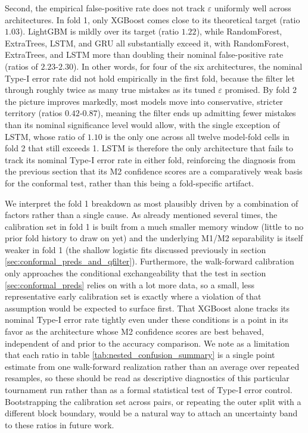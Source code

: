 \documentclass[12pt, a4paper]{article}
\begin{document}
\medskip

Second, the empirical false-positive rate does not track $\varepsilon$ uniformly well across architectures. In fold 1, only XGBoost 
comes close to its theoretical target (ratio $1.03$). LightGBM is mildly over its target (ratio $1.22$), while RandomForest, ExtraTrees, LSTM, and GRU all substantially exceed 
it, with RandomForest, ExtraTrees, and LSTM more than doubling their nominal false-positive rate (ratios of $2.23$-$2.30$). In other words, for four of the six architectures, the 
nominal Type-I error rate did not hold empirically in the first fold, because the filter let through roughly twice as many true mistakes as its tuned $\varepsilon$ promised. By fold 2 the 
picture improves markedly, most models move into conservative, stricter territory (ratios $0.42$-$0.87$), meaning the filter ends up admitting fewer mistakes than its 
nominal significance level would allow, with the single exception of LSTM, whose ratio of $1.10$ is the only one across all twelve model-fold cells in fold 2 that still exceeds 1. LSTM is therefore the only 
architecture that fails to track its nominal Type-I error rate in either fold, reinforcing the diagnosis from the previous section that its M2 confidence scores are a 
comparatively weak basis for the conformal test, rather than this being a fold-specific artifact.

\medskip

We interpret the fold 1 breakdown as most plausibly driven by a combination of factors rather than a single cause. As already mentioned several times, the calibration set in fold 1 
is built from a much smaller memory window (little to no prior fold history to draw on yet) and the underlying M1/M2 separability is itself weaker in fold 1 
(the shallow logistic fits discussed previously in section \ref{sec:conformal_preds_and_qfilter}). Furthermore, the walk-forward calibration only approaches the conditional 
exchangeability that the test in section \ref{sec:conformal_preds} relies on with a lot more data, so a small, less representative early calibration set is exactly where a violation of 
that assumption would be expected to surface first. That XGBoost alone tracks its nominal Type-I error rate tightly even under these conditions is a point in its favor as the 
architecture whose M2 confidence scores are best behaved, independent of and prior to the accuracy comparison. We note as a limitation that each ratio in table \ref{tab:nested_confusion_summary} is a single 
point estimate from one walk-forward realization rather than an average over repeated resamples, so these should be read as descriptive diagnostics of this particular tournament run 
rather than as a formal statistical test of Type-I error control. Bootstrapping the calibration set across pairs, or repeating the outer split with a different block boundary, 
would be a natural way to attach an uncertainty band to these ratios in future work.
\end{document}
